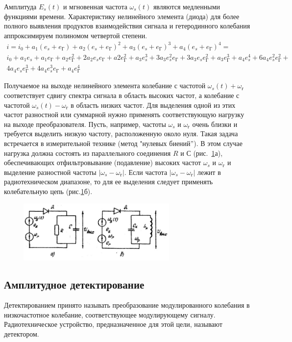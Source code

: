 Амплитуда $E_s(t)$ и мгновенная частота $\omega_s(t)$ являются медленными функциями времени. Характеристику нелинейного элемента (диода) для более полного выявления продуктов взаимодействия сигнала и гетеродинного колебания аппроксимируем полиномом четвертой степени.
\begin{gather}
	i=i_0+a_1(e_s+e_{\text{Г}})+a_2(e_s+e_{\text{Г}})^2+
	a_3(e_s+e_{\text{Г}})^3
	+a_4(e_s+e_{\text{Г}})^4= \\
	i_0+a_1e_s+a_1e_{\text{Г}}+a_2e_{\text{Г}}^2+
	2a_2e_se_{\text{Г}}+a2e_{\text{Г}}^2+a_3e_s^3+
	3a_3e_s^2e_{\text{Г}}+3a_3e_se_{\text{Г}}^2+
	a_3e_{\text{Г}}^3+a_4e_s^4+6a_4e_s^2e_{\text{Г}}^2+\\
	4a_4e_se_{\text{Г}}^3+4a_4e_s^3e_{\text{Г}}+a_4e_{\text{Г}}^4
\end{gather}

Получаемое на выходе нелинейного элемента колебание с частотой $\omega_s(t)+\omega_{\text{г}}$ соответствует сдвигу спектра сигнала в область высоких частот, а колебание с частотой $\omega_s(t)-\omega_{\text{г}}$ в область низких частот. Для выделения одной из этих частот разностной или суммарной нужно применять соответствующую нагрузку на выходе преобразователя. Пусть, например, частоты $\omega_s$ и $\omega_{\text{г}}$ очень близки и требуется выделить низкую частоту, расположенную около нуля. Такая задача встречается в измерительной технике (метод "нулевых биений”). В этом случае нагрузка должна состоять из параллельного соединения $R$ и $С$ (рис.~\ref{pic:7}а), обеспечивающих отфильтровывание (подавление) высоких частот $\omega_s$ и $\omega_{\text{г}}$ и выделение разностной частоты $|\omega_s - \omega_{\text{г}}|$. Если частота	$|\omega_s - \omega_{\text{г}}|$ лежит в радиотехническом диапазоне, то для ее выделения следует применять колебательную цепь (рис.\ref{pic:7}б).
\begin{figure}[h!]
	\centering
	\includegraphics[width=0.7\textwidth]{picture/pic7.jpg}
	\caption{}
	\label{pic:7}
\end{figure}
\subsection{Амплитудное детектирование}
Детектированием принято называть преобразование модулированного колебания в
низкочастотное колебание, соответствующее модулирующему сигналу. Радиотехническое устройство, предназначенное для этой цели, называют детектором.

